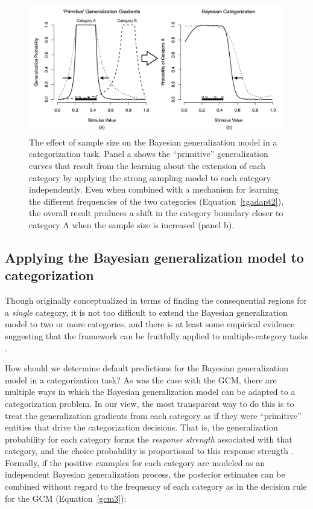 \documentclass[doc,apacite]{apa6}
\begin{document}
\begin{figure}[t]
\begin{center}
\includegraphics[scale=.4]{figures/Bayes-cat.png}
\caption{The effect of sample size on the Bayesian generalization model in a categorization task. Panel a shows the ``primitive'' generalization curves that result from the learning about the extension of each category by applying the strong sampling model to each category independently. Even when combined with a mechanism for learning the different frequencies of the two categories (Equation~\ref{tgadapt2}), the overall result produces a shift in the category boundary closer to category A when the sample size is increased (panel b).}
\label{fig:bayesExample2}
\end{center}
\end{figure}


\subsection{Applying the Bayesian generalization model to categorization}

Though originally conceptualized in terms of finding the consequential regions for a {\it single} category, it is not too difficult to extend the Bayesian generalization model to two or more categories, and there is at least some empirical evidence suggesting that the framework can be fruitfully applied to multiple-category tasks \cite{vong2013role}. 

How should we determine default predictions for the Bayesian generalization model in a categorization task? As was the case with the GCM, there are multiple ways in which the Bayesian generalization model can be adapted to a categorization problem. In our view, the most transparent way to do this is to treat the generalization gradients from each category as if they were ``primitive'' entities that drive the categorization decisions. That is, the generalization probability for each category forms the {\it response strength} associated with that category, and the choice probability is proportional to this response strength \cite{luce1959individual}. Formally, if the positive examples for each category are modeled as an independent Bayesian generalization process, the posterior estimates can be combined without regard to the frequency of each category as in the decision rule for the GCM (Equation~\ref{gcm3}):
\end{document}

